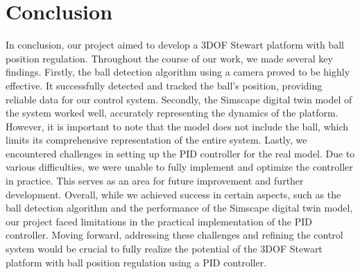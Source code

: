 \section{Conclusion}
In conclusion, our project aimed to develop a 3DOF Stewart platform with ball position regulation. Throughout the course of our work, we made several key findings.
\newline\newline
Firstly, the ball detection algorithm using a camera proved to be highly effective. It successfully detected and tracked the ball's position, providing reliable data for our control system.
\newline
Secondly, the Simscape digital twin model of the system worked well, accurately representing the dynamics of the platform. However, it is important to note that the model does not include the ball, which limits its comprehensive representation of the entire system.
\newline
Lastly, we encountered challenges in setting up the PID controller for the real model. Due to various difficulties, we were unable to fully implement and optimize the controller in practice. This serves as an area for future improvement and further development.
\newline\newline
Overall, while we achieved success in certain aspects, such as the ball detection algorithm and the performance of the Simscape digital twin model, our project faced limitations in the practical implementation of the PID controller. Moving forward, addressing these challenges and refining the control system would be crucial to fully realize the potential of the 3DOF Stewart platform with ball position regulation using a PID controller.


\medskip




